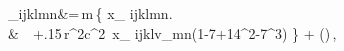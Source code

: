 _{ijklmn}&=\nu\,m\,\left\{ x_{\langle
  ijklmn\rangle}\right.\nonumber
\\ &~~+\left.{15}\,{r^2\over c^2}\, x_{\langle
  ijkl}v_{mn\rangle}\left(1-7\nu+14\nu^2-7\nu^3\right) \right\} +
\left(\right)\label{I6}\,,\\
